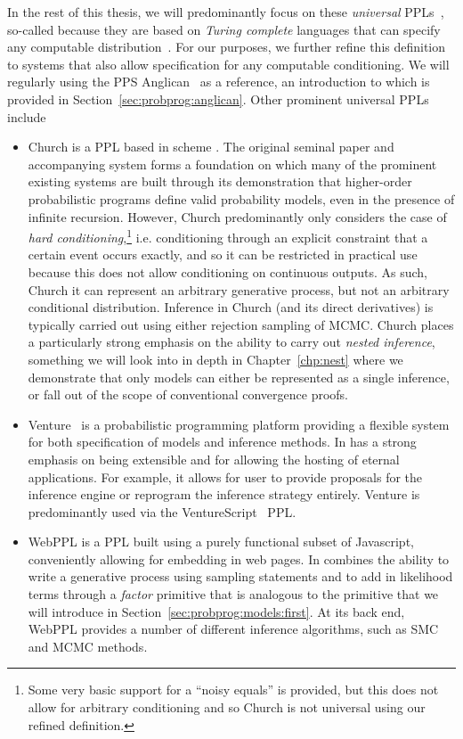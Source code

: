 In the rest of this thesis, we will predominantly focus on these \emph{universal} PPLs~\citep{goodman_uai_2008,staton2016semantics}, 
so-called because they are based on \emph{Turing complete} languages that can specify any
computable distribution~\citep{goodman2013principles}.  For our purposes, we further refine this definition
to systems that also allow specification for any computable conditioning.
We will regularly using the PPS Anglican~\citep{wood2014new} as a reference, an introduction
to which is provided in Section~\ref{sec:probprog:anglican}. Other prominent
universal PPLs include
\begin{itemize}
\item Church is a PPL based in scheme \cite{goodman_uai_2008}.  
The original seminal paper and accompanying system 
	forms a foundation on which many of the prominent existing systems are built through its
	demonstration that higher-order probabilistic programs define valid probability models, even in
	the presence of infinite recursion.  However, Church predominantly only considers the case of \emph{hard
		conditioning},\footnote{Some very basic support for a ``noisy equals'' is provided, but this does not
		allow for arbitrary conditioning and so Church is not universal using our refined definition.}
	 i.e. conditioning through an explicit constraint that a certain event occurs exactly,
	and so it can be restricted in practical use because this does not allow conditioning on continuous
	outputs.
	As such, Church it can represent an arbitrary generative process, but not an arbitrary conditional distribution. 
	Inference in Church (and its direct derivatives) is typically carried out using either rejection sampling
	of MCMC.  Church places a particularly strong emphasis on the ability to carry out \emph{nested inference},
	something we will look into in depth in Chapter~\ref{chp:nest} where we demonstrate that only models
	can either be represented as a single inference, or fall out of the scope of conventional convergence proofs.
\item Venture~\citep{mansinghka2014venture} is a probabilistic programming platform providing a flexible
system for both specification of models and inference methods.  In has a strong emphasis on being extensible
and for allowing the hosting of eternal applications.  For example, it allows for user to provide proposals for
the inference engine or reprogram the inference strategy entirely.  Venture is predominantly used via the
VentureScript~\citep{mansinghka2014venture} PPL.
\item WebPPL \citep{goodman_book_2014} is a PPL built using a purely functional subset of Javascript,
conveniently allowing for embedding in web pages.
In combines the ability to write a generative process using sampling statements and to add in likelihood
terms through a \emph{factor} primitive that is analogous to the \observe primitive that we will introduce
in Section~\ref{sec:probprog:models:first}.  At its back end, WebPPL provides a number of different inference
algorithms, such as SMC and MCMC methods.
\end{itemize}

